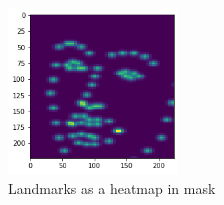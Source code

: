 \begin{figure}[H]
  \begin{center}
  \includegraphics[angle=0, width=0.4\textwidth]{Figures/landmarks_as_heatmap_in_mask.png}
  \caption{Landmarks as a heatmap in mask}
  \label{fig:LandmarksMask}
  \end{center}
\end{figure}




